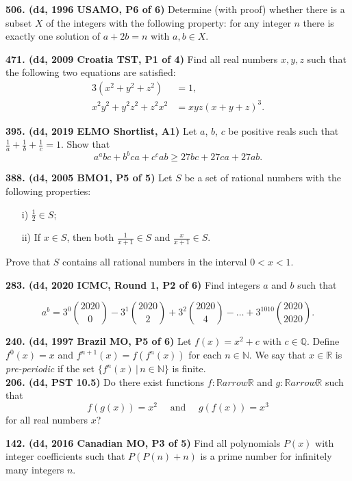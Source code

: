 \documentclass{article}
\begin{document}
\textbf{506. (\color{red}d4\color{black}, 1996 USAMO, P6 of 6)} Determine (with proof) whether there is a subset $X$ of the integers with the following property: for any integer $n$ there is exactly one solution of $a + 2b = n$ with $a,b \in X$.

\textbf{471. (\color{red}d4\color{black}, 2009 Croatia TST, P1 of 4)} Find all real numbers $x, y, z$ such that the following two equations are satisfied: \begin{align*}3(x^2+y^2+z^2) &= 1,\\ x^2y^2 + y^2z^2 + z^2x^2 &= xyz(x+y+z)^3.\end{align*}

\textbf{395. (\color{red}d4\color{black}, 2019 ELMO Shortlist, A1)} Let $a$, $b$, $c$ be positive reals such that $\frac{1}{a}+\frac{1}{b}+\frac{1}{c}=1$. Show that $$a^abc+b^bca+c^cab\ge 27bc+27ca+27ab.$$

\textbf{388. (\color{red}d4\color{black}, 2005 BMO1, P5 of 5)} Let $S$ be a set of rational numbers with the following properties:
\begin{enumerate}
    \item[i)] $\frac12\in S$;
    \item[ii)] If $x\in S$, then both $\frac{1}{x+1}\in S$ and $\frac{x}{x+1}\in S$.
\end{enumerate}
Prove that $S$ contains all rational numbers in the interval $0<x<1$.

\textbf{283. (\color{red}d4\color{black}, 2020 ICMC, Round 1, P2 of 6)} Find integers \( a \) and \( b \) such that

\[a^b = 3^0\binom{2020}{0} - 3^1\binom{2020}{2} + 3^2\binom{2020}{4} - \dots + 3^{1010}\binom{2020}{2020}.\]

\textbf{240. (\color{red}d4\color{black}, 1997 Brazil MO, P5 of 6)} Let $f(x) = x^2 + c$ with $c \in \mathbb{Q}$. Define $f^0(x) = x$ and $f^{n+1}(x) = f(f^n(x))$ for each $n \in \mathbb{N}$. We say that $x \in \mathbb{R}$ is \emph{pre-periodic} if the set $\{f^n(x) \, | \, n \in \mathbb{N}\}$ is finite.\\

\textbf{206. (\color{red}d4\color{black}, PST 10.5)} Do there exist functions \(f : \mathbb{R} arrow \mathbb{R}\) and \(g : \mathbb{R} arrow \mathbb{R}\) such that \[f(g(x)) = x^2 \quad \text{ and } \quad g(f(x)) = x^3\] for all real numbers \(x\)?

\textbf{142. (\color{red}d4\color{black}, 2016 Canadian MO, P3 of 5)} Find all polynomials \(P(x)\) with integer coefficients such that \(P(P(n) + n)\) is a prime number for infinitely many integers \(n\).
\end{document}
